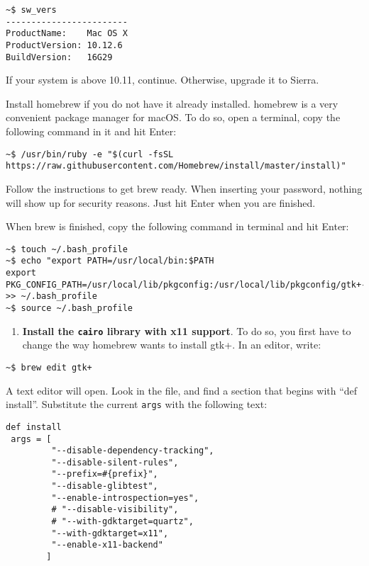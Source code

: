\documentclass[]{article}
\providecommand{\tightlist}{%
  \setlength{\itemsep}{0pt}\setlength{\parskip}{0pt}}
\begin{document}
\begin{verbatim}
~$ sw_vers  
------------------------  
ProductName:    Mac OS X  
ProductVersion: 10.12.6  
BuildVersion:   16G29  
\end{verbatim}

If your system is above 10.11, continue. Otherwise, upgrade it to
Sierra.

Install homebrew if you do not have it already installed. homebrew is a
very convenient package manager for macOS. To do so, open a terminal,
copy the following command in it and hit Enter:

\begin{verbatim}
~$ /usr/bin/ruby -e "$(curl -fsSL https://raw.githubusercontent.com/Homebrew/install/master/install)"
\end{verbatim}

Follow the instructions to get brew ready. When inserting your password,
nothing will show up for security reasons. Just hit Enter when you are
finished.

When brew is finished, copy the following command in terminal and hit
Enter:

\begin{verbatim}
~$ touch ~/.bash_profile
~$ echo "export PATH=/usr/local/bin:$PATH
export PKG_CONFIG_PATH=/usr/local/lib/pkgconfig:/usr/local/lib/pkgconfig/gtk+-2.0.pc:/opt/X11/lib/pkgconfig" >> ~/.bash_profile
~$ source ~/.bash_profile
\end{verbatim}

\begin{enumerate}
\def\labelenumi{\arabic{enumi}.}
\setcounter{enumi}{1}
\tightlist
\item
  \textbf{Install the \texttt{cairo} library with x11 support}. To do
  so, you first have to change the way homebrew wants to install gtk+.
  In an editor, write:
\end{enumerate}

\begin{verbatim}
~$ brew edit gtk+
\end{verbatim}

A text editor will open. Look in the file, and find a section that
begins with ``def install''. Substitute the current \texttt{args} with
the following text:

\begin{verbatim}
def install
 args = [
         "--disable-dependency-tracking",
         "--disable-silent-rules",
         "--prefix=#{prefix}",
         "--disable-glibtest",
         "--enable-introspection=yes",
         # "--disable-visibility",
         # "--with-gdktarget=quartz",
         "--with-gdktarget=x11",
         "--enable-x11-backend"
        ]
\end{verbatim}
\end{document}
